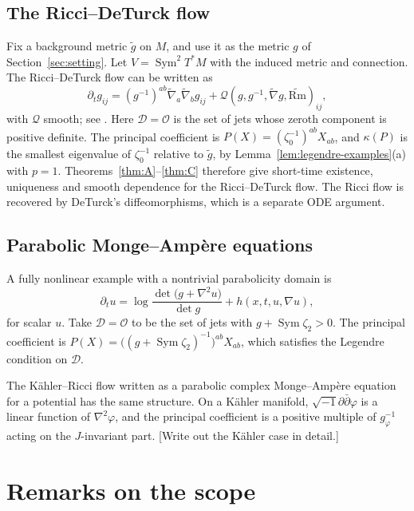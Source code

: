 \documentclass[11pt,reqno]{amsart}
\theoremstyle{definition}
\theoremstyle{remark}
\newcommand{\Dom}{\mathcal{D}}
\newcommand{\Par}{\mathcal{O}}
\newcommand{\todo}[1]{\textcolor{red!70!black}{[#1]}}
\numberwithin{equation}{section}
\begin{document}
\subsection{The Ricci--DeTurck flow}\label{ex:rdt}
Fix a background metric $\tilde g$ on $M$, and use it as the metric $g$ of Section~\ref{sec:setting}.
Let $V=\operatorname{Sym}^2T^*M$ with the induced metric and connection. The Ricci--DeTurck flow
\cite{DeTurck,Hamilton82} can be written as
\[
  \partial_tg_{ij}=(g^{-1})^{ab}\tilde\nabla_a\tilde\nabla_bg_{ij}+\mathcal Q(g,g^{-1},\tilde\nabla g,\widetilde{\mathrm{Rm}})_{ij},
\]
with $\mathcal Q$ smooth; see \cite{Shi,ChowKnopf}. Here $\Dom=\Par$ is the set of jets whose zeroth
component is positive definite. The principal coefficient is $P(X)=(\zeta_0^{-1})^{ab}X_{ab}$, and
$\kappa(P)$ is the smallest eigenvalue of $\zeta_0^{-1}$ relative to $\tilde g$, by
Lemma~\ref{lem:legendre-examples}(a) with $p=1$. Theorems~\ref{thm:A}--\ref{thm:C} therefore give
short-time existence, uniqueness and smooth dependence for the Ricci--DeTurck flow. The Ricci flow is
recovered by DeTurck's diffeomorphisms, which is a separate ODE argument.

\subsection{Parabolic Monge--Amp\`ere equations}
A fully nonlinear example with a nontrivial parabolicity domain is
\[
  \partial_tu=\log\frac{\det\bigl(g+\nabla^2u\bigr)}{\det g}+h(x,t,u,\nabla u),
\]
for scalar $u$. Take $\Dom=\Par$ to be the set of jets with $g+\operatorname{Sym}\zeta_2>0$. The
principal coefficient is $P(X)=\bigl((g+\operatorname{Sym}\zeta_2)^{-1}\bigr)^{ab}X_{ab}$, which
satisfies the Legendre condition on $\Dom$.

The K\"ahler--Ricci flow written as a parabolic complex Monge--Amp\`ere equation for a potential
\cite{Cao} has the same structure. On a K\"ahler manifold, $\sqrt{-1}\partial\bar\partial\varphi$ is a
linear function of $\nabla^2\varphi$, and the principal coefficient is a positive multiple of
$g_\varphi^{-1}$ acting on the $J$-invariant part. \todo{Write out the K\"ahler case in detail.}

\section{Remarks on the scope}\label{sec:scope}
\end{document}
